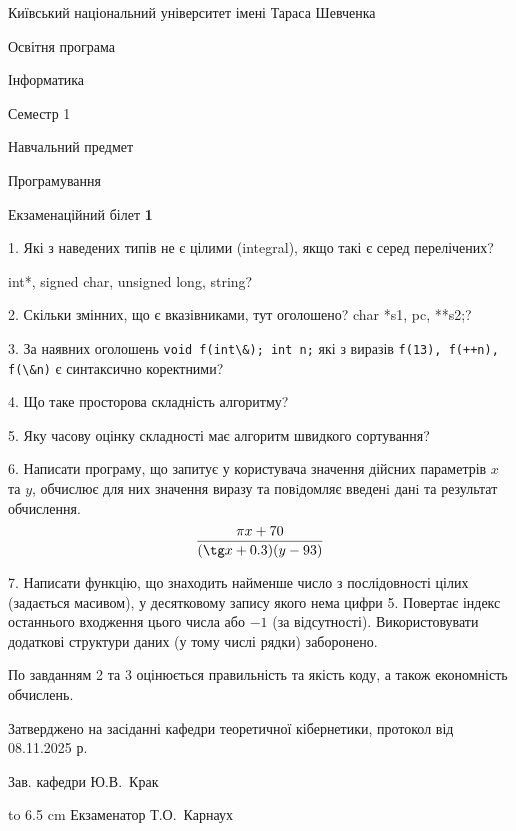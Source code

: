 \documentclass[12pt, ukrainian]{article}
\def\code#1{\Verb!#1!}
\begin{document}
{{\begin {scriptsize}\par
{ \center  Київський національний університет імені Тараса Шевченка \par}
{\parbox {5 cm}{Освітня програма \hfill}{\parbox {7 cm}{Інформатика\hfill}}\parbox {6 cm}{\hfill Семестр 1}}\par
{\parbox {5 cm} {Навчальний предмет \hfill}\parbox {7 cm}{Програмування \hfill}\parbox {6cm}{\hfill}\par}\vspace{-15pt} \end{scriptsize}}{\center Екзаменаційний білет \No \textbf { 1 }\par}}
{%
1. Які з наведених типів не є цілими (integral), якщо такі є серед перелічених?

int*, signed char, unsigned long, string?
\par
\vspace{2mm}
2. Скільки змінних, що є вказівниками, тут оголошено?
char *s1, pc, **s2;?
\par
\vspace{2mm}
3. За наявних оголошень \code{void f(int\&); int n;} які з виразів \code{f(13), f(++n), f(\&n)} є синтаксично коректними?
\par
\vspace{2mm}
4. Що таке просторова складність алгоритму?
\par
\vspace{2mm}
5. Яку часову оцінку складності має алгоритм швидкого сортування?
\par
\vspace{2mm}
6. Написати програму, що запитує у користувача значення дійсних параметрів $x$ та $y$, обчислює для них значення виразу та повiдомляє введенi данi та результат обчислення.
$$\frac{\pi x + 70}{(\tg x + 0.3) (y - 93)}$$ 

\par
7. Написати функцію, що знаходить найменше число з послідовності цілих (задається масивом), у десятковому запису якого нема цифри 5. Повертає індекс останнього входження цього числа або $-1$ (за відсутності). Використовувати додаткові структури даних (у тому числі рядки) заборонено.

По завданням 2 та 3 оцінюється правильність та якість коду, а також економність обчислень.

}
{\smallskip\smallskip \begin {scriptsize} Затверджено на засіданні кафедри теоретичної кібернетики, протокол   від   08.11.2025 р.\par\smallskip\smallskip\smallskip\smallskip
{\parbox {6.5 cm} {Зав. кафедри \dotfill Ю.В.~Крак}}\hspace {0.7cm} {\hbox to 6.5 cm { Екзаменатор \dotfill Т.О.~Карнаух}} \end{scriptsize}}
\end{document}
